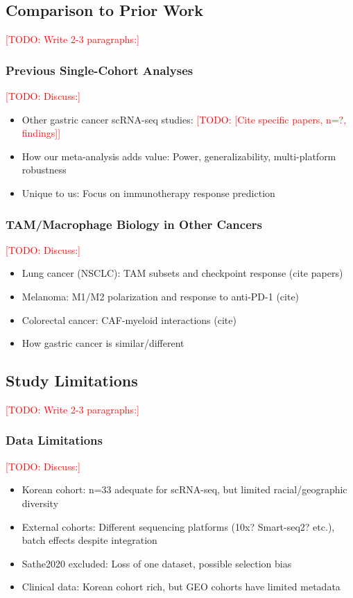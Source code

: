 \documentclass[12pt,oneside]{article}
\newcommand{\TODO}[1]{\textcolor{red}{[TODO: #1]}}
\begin{document}
\subsection{Comparison to Prior Work}
\TODO{Write 2-3 paragraphs:}

\subsubsection*{Previous Single-Cohort Analyses}
\TODO{Discuss:}
\begin{itemize}
    \item Other gastric cancer scRNA-seq studies: \TODO{[Cite specific papers, n=?, findings]}
    \item How our meta-analysis adds value: Power, generalizability, multi-platform robustness
    \item Unique to us: Focus on immunotherapy response prediction
\end{itemize}

\subsubsection*{TAM/Macrophage Biology in Other Cancers}
\TODO{Discuss:}
\begin{itemize}
    \item Lung cancer (NSCLC): TAM subsets and checkpoint response (cite papers)
    \item Melanoma: M1/M2 polarization and response to anti-PD-1 (cite)
    \item Colorectal cancer: CAF-myeloid interactions (cite)
    \item How gastric cancer is similar/different
\end{itemize}

\subsection{Study Limitations}
\TODO{Write 2-3 paragraphs:}

\subsubsection*{Data Limitations}
\TODO{Discuss:}
\begin{itemize}
    \item Korean cohort: n=33 adequate for scRNA-seq, but limited racial/geographic diversity
    \item External cohorts: Different sequencing platforms (10x? Smart-seq2? etc.), batch effects despite integration
    \item Sathe2020 excluded: Loss of one dataset, possible selection bias
    \item Clinical data: Korean cohort rich, but GEO cohorts have limited metadata
\end{itemize}
\end{document}

